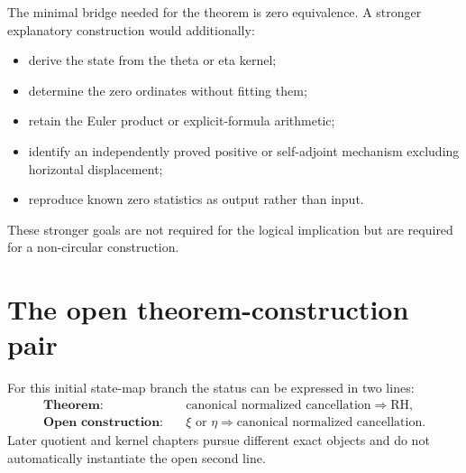 The minimal bridge needed for the theorem is zero equivalence. A stronger explanatory construction would additionally:
\begin{itemize}
  \item derive the state from the theta or eta kernel;
  \item determine the zero ordinates without fitting them;
  \item retain the Euler product or explicit-formula arithmetic;
  \item identify an independently proved positive or self-adjoint mechanism excluding horizontal displacement;
  \item reproduce known zero statistics as output rather than input.
\end{itemize}
These stronger goals are not required for the logical implication but are required for a non-circular construction.

\section{The open theorem-construction pair}

For this initial state-map branch the status can be expressed in two lines:
\begin{align*}
 \textbf{Theorem:}&\quad \text{canonical normalized cancellation}\Longrightarrow\text{RH},\\
 \textbf{Open construction:}&\quad \xi\text{ or }\eta\Longrightarrow\text{canonical normalized cancellation}.
\end{align*}
Later quotient and kernel chapters pursue different exact objects and do not automatically instantiate the open second line.
